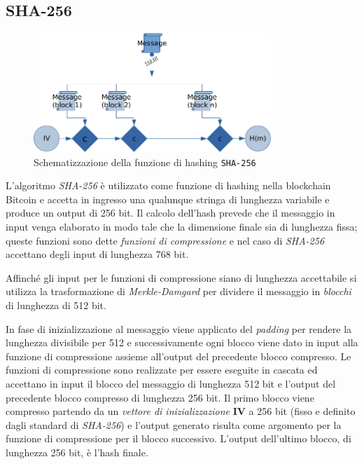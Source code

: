 \subsection{SHA-256}
\begin{figure}
    \centering
    \includegraphics[width=0.8\textwidth]{images/sha256.png}
    \caption{Schematizzazione della funzione di hashing \texttt{SHA-256}}
\end{figure}
L'algoritmo \textit{SHA-256} è utilizzato come funzione di hashing nella blockchain Bitcoin e accetta in ingresso una qualunque stringa di lunghezza variabile e produce un output di 256 bit.\newline
Il calcolo dell'hash prevede che il messaggio in input venga elaborato in modo tale che la dimensione finale sia di lunghezza fissa; queste funzioni sono dette \textit{funzioni di compressione} e nel caso di \textit{SHA-256} accettano degli input di lunghezza 768 bit.

Affinché gli input per le funzioni di compressione siano di lunghezza accettabile si utilizza la trasformazione di \textit{Merkle-Damgard} per dividere il messaggio in \textit{blocchi} di lunghezza di 512 bit.

In fase di inizializzazione al messaggio viene applicato del \textit{padding} per rendere la lunghezza divisibile per 512 e successivamente ogni blocco viene dato in input alla funzione di compressione assieme all'output del precedente blocco compresso. Le funzioni di compressione sono realizzate per essere eseguite in cascata ed accettano in input il blocco del messaggio di lunghezza 512 bit e l'output del precedente blocco compresso di lunghezza 256 bit.\newline
Il primo blocco viene compresso partendo da un \textit{vettore di inizializzazione} \textbf{IV} a 256 bit (fisso e definito dagli standard di \textit{SHA-256}) e l'output generato risulta come argomento per la funzione di compressione per il blocco successivo. L'output dell'ultimo blocco, di lunghezza 256 bit, è l'hash finale.

